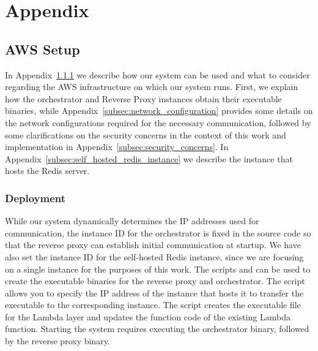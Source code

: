 \chapter{Appendix}
\label{app:a}

\section{AWS Setup}
\label{sec:aws_setup}
In Appendix~\ref{subsec:deployment} we describe how our system can be used and what to consider regarding the AWS infrastructure on which our system runs. First, we explain how the orchestrator and Reverse Proxy instances obtain their executable binaries, while Appendix~\ref{subsec:network_configuration} provides some details on the network configurations required for the necessary communication, followed by some clarifications on the security concerns in the context of this work and implementation in Appendix~\ref{subsec:security_concerns}. In Appendix~\ref{subsec:self_hosted_redis_instance} we describe the instance that hosts the Redis server.

\subsection{Deployment}
\label{subsec:deployment}
While our system dynamically determines the IP addresses used for communication, the instance ID for the orchestrator is fixed in the source code so that the reverse proxy can establish initial communication at startup. We have also set the instance ID for the self-hosted Redis instance, since we are focusing on a single instance for the purposes of this work. The scripts  and  can be used to create the executable binaries for the reverse proxy and orchestrator. The script allows you to specify the IP address of the instance that hosts it to transfer the executable to the corresponding instance. The  script creates the executable file for the Lambda layer and updates the function code of the existing Lambda function. Starting the system requires executing the orchestrator binary, followed by the reverse proxy binary.

